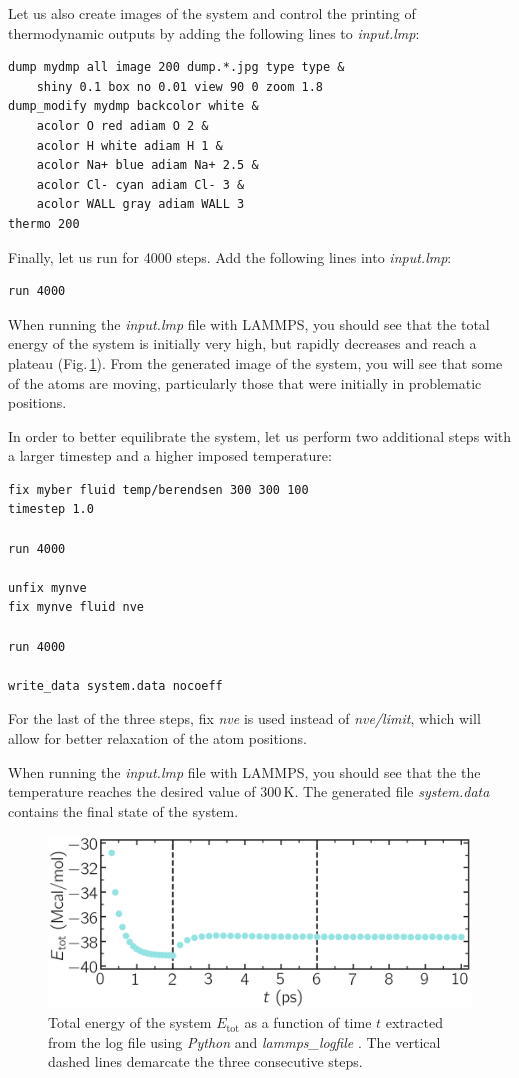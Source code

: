 \documentclass[9pt,tutorial]{livecoms}
\begin{document}
Let us also create images of the system and control
the printing of thermodynamic outputs by adding the following lines to \textit{input.lmp}:
\begin{lstlisting}
dump mydmp all image 200 dump.*.jpg type type &
    shiny 0.1 box no 0.01 view 90 0 zoom 1.8
dump_modify mydmp backcolor white &
    acolor O red adiam O 2 &
    acolor H white adiam H 1 &
    acolor Na+ blue adiam Na+ 2.5 &
    acolor Cl- cyan adiam Cl- 3 &
    acolor WALL gray adiam WALL 3
thermo 200
\end{lstlisting}
Finally, let us run for 4000 steps. Add the following lines into \textit{input.lmp}:
\begin{lstlisting}
run 4000
\end{lstlisting}
When running the \textit{input.lmp} file with LAMMPS, you should see that the
total energy of the system is initially very high, but rapidly decreases and
reach a plateau (Fig.\,\ref{fig:NANOSHEAR-minimization}). From the generated image of the system,
you will see that some of the atoms are moving, particularly those that were
initially in problematic positions.

In order to better equilibrate the system, let us perform two additional steps
with a larger timestep and a higher imposed temperature:
\begin{lstlisting}
fix myber fluid temp/berendsen 300 300 100
timestep 1.0

run 4000

unfix mynve
fix mynve fluid nve

run 4000

write_data system.data nocoeff
\end{lstlisting}
For the last of the three steps, fix \textit{nve} is used instead of
\textit{nve/limit}, which will allow for better relaxation of the atom positions.

When running the \textit{input.lmp} file with LAMMPS, you should see that the
the temperature reaches the desired value of $300\,\text{K}$. The generated file
\textit{system.data} contains the final state of the system.

\begin{figure}
\centering
\includegraphics[width=\linewidth]{NANOSHEAR-minimization}
\caption{Total energy of the system $E_\text{tot}$ as a function of time $t$
extracted from the log file using \textit{Python} and \textit{lammps\_logfile}
\cite{sveinsson2021logfile}. The vertical dashed lines demarcate the three
consecutive steps.}
\label{fig:NANOSHEAR-minimization}
\end{figure}
\end{document}
